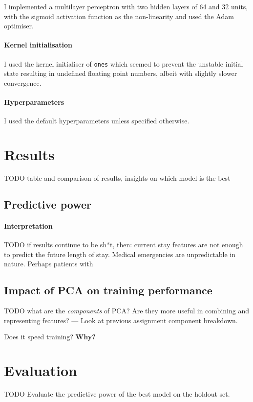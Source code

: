 \documentclass[10pt, twocolumn]{article}
\begin{document}
I implemented a multilayer perceptron with two hidden layers of 64 and 32 units, with the sigmoid activation function as the non-linearity and used the Adam optimiser. 

\paragraph{Kernel initialisation} I used the kernel initialiser of \texttt{ones} which seemed to prevent the unstable initial state resulting in undefined floating point numbers, albeit with slightly slower convergence.


\paragraph{Hyperparameters} I used the default hyperparameters unless specified otherwise.

\section{Results}
TODO table and comparison of results, insights on which model is the best




\subsection{Predictive power}

\paragraph{Interpretation}
TODO if results continue to be sh*t, then: current stay features are not enough to predict the future length of stay. Medical emergencies are unpredictable in nature. Perhaps patients with 

\subsection{Impact of PCA on training performance}
TODO what are the \textit{components} of PCA? Are they more useful in combining and representing features? — Look at previous assignment component breakdown.

Does it speed training? \textbf{Why?}


\section{Evaluation}
TODO Evaluate the predictive power of the best model on the holdout set.


\medskip
 


\end{document}
